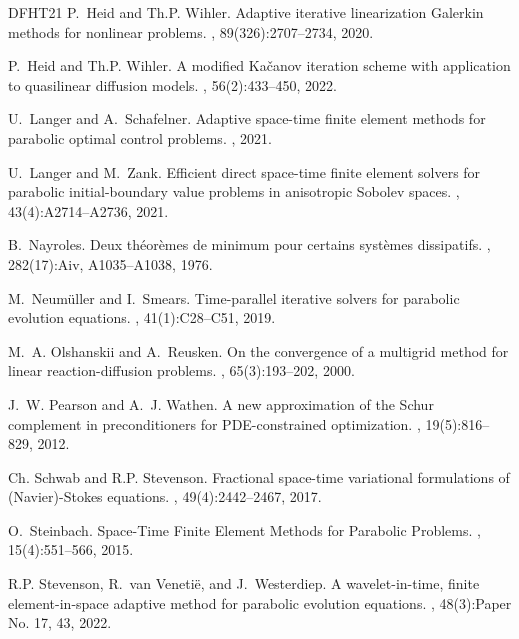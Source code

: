 \documentclass{amsart}
\numberwithin{equation}{section}
\newcommand{\1}{\mathbb 1}
\begin{document}
\begin{thebibliography}{DFHT21}
P.~Heid and Th.P. Wihler.
\newblock Adaptive iterative linearization {G}alerkin methods for nonlinear
  problems.
, 89(326):2707--2734, 2020.

P.~Heid and Th.P. Wihler.
\newblock A modified {K}a\v{c}anov iteration scheme with application to
  quasilinear diffusion models.
, 56(2):433--450, 2022.

U.~Langer and A.~Schafelner.
\newblock Adaptive space-time finite element methods for parabolic optimal
  control problems.
, 2021.

U.~Langer and M.~Zank.
\newblock Efficient direct space-time finite element solvers for parabolic
  initial-boundary value problems in anisotropic {S}obolev spaces.
, 43(4):A2714--A2736, 2021.

B.~Nayroles.
\newblock Deux th\'{e}or\`emes de minimum pour certains syst\`emes dissipatifs.
, 282(17):Aiv, A1035--A1038,
  1976.

M.~Neum\"{u}ller and I.~Smears.
\newblock Time-parallel iterative solvers for parabolic evolution equations.
, 41(1):C28--C51, 2019.

M.~A. Olshanskii and A.~Reusken.
\newblock On the convergence of a multigrid method for linear
  reaction-diffusion problems.
, 65(3):193--202, 2000.

J.~W. Pearson and A.~J. Wathen.
\newblock A new approximation of the {S}chur complement in preconditioners for
  {PDE}-constrained optimization.
, 19(5):816--829, 2012.

Ch. Schwab and R.P. Stevenson.
\newblock Fractional space-time variational formulations of {(Navier)-Stokes}
  equations.
, 49(4):2442--2467, 2017.

O.~Steinbach.
\newblock Space-{T}ime {F}inite {E}lement {M}ethods for {P}arabolic {P}roblems.
, 15(4):551--566, 2015.

R.P. Stevenson, R.~van Veneti\"{e}, and J.~Westerdiep.
\newblock A wavelet-in-time, finite element-in-space adaptive method for
  parabolic evolution equations.
, 48(3):Paper No. 17, 43, 2022.


\end{thebibliography}
\end{document}
